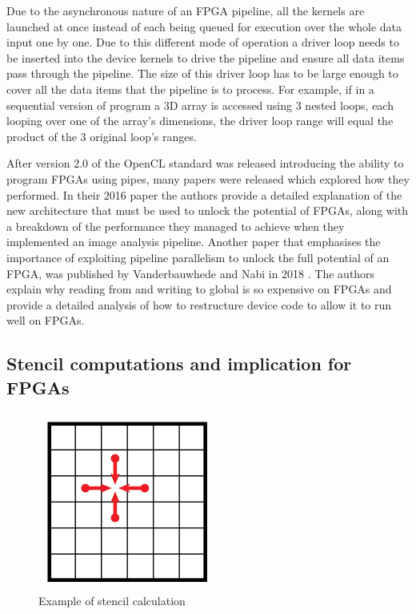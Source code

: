 \documentclass{mpaper}
\begin{document}
Due to the asynchronous nature of an FPGA pipeline, all the kernels are launched at once instead of each being queued for execution over the whole data input one by one.
Due to this different mode of operation a driver loop needs to be inserted into the device kernels to drive the pipeline and ensure all data items pass through the pipeline.
The size of this driver loop has to be large enough to cover all the data items that the pipeline is to process.
For example, if in a sequential version of program a 3D array is accessed using 3 nested loops, each looping over one of the array's dimensions, the driver loop range will equal the product of the 3 original loop's ranges. 

After version 2.0 of the OpenCL standard was released introducing the ability to program FPGAs using pipes, many papers were released which explored how they performed.
In their 2016 paper \cite{Momeni2016} the authors provide a detailed explanation of the new architecture that must be used to unlock the potential of FPGAs, along with a breakdown of the performance they managed to achieve when they implemented an image analysis pipeline.
Another paper that emphasises the importance of exploiting pipeline parallelism to unlock the full potential of an FPGA, was published by Vanderbauwhede and Nabi in 2018 \cite{VanderbauwhedeNabi2018}.
The authors explain why reading from and writing to global is so expensive on FPGAs and provide a detailed analysis of how to restructure device code to allow it to run well on FPGAs.

\subsection{Stencil computations and implication for FPGAs}
\label{stencil_computations}

\begin{figure}
    \centering
    \includegraphics[scale=0.5]{images/stencil.png}
    \caption{Example of stencil calculation}
    \label{fig:stencil}
\end{figure}
\end{document}
